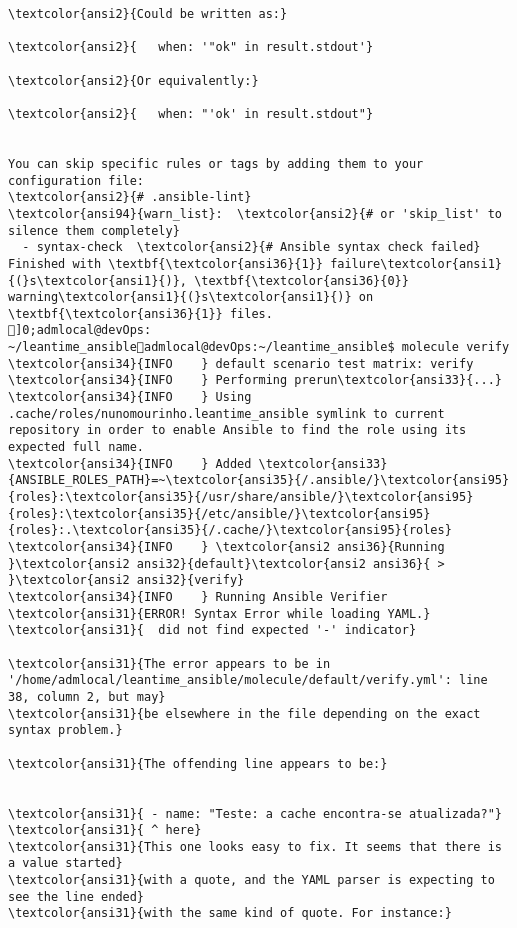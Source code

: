 \documentclass{scrartcl}
\begin{document}
\begin{Verbatim}
\textcolor{ansi2}{Could be written as:}

\textcolor{ansi2}{   when: '"ok" in result.stdout'}

\textcolor{ansi2}{Or equivalently:}

\textcolor{ansi2}{   when: "'ok' in result.stdout"}


You can skip specific rules or tags by adding them to your configuration file:
\textcolor{ansi2}{# .ansible-lint}
\textcolor{ansi94}{warn_list}:  \textcolor{ansi2}{# or 'skip_list' to silence them completely}
  - syntax-check  \textcolor{ansi2}{# Ansible syntax check failed}
Finished with \textbf{\textcolor{ansi36}{1}} failure\textcolor{ansi1}{(}s\textcolor{ansi1}{)}, \textbf{\textcolor{ansi36}{0}} warning\textcolor{ansi1}{(}s\textcolor{ansi1}{)} on \textbf{\textcolor{ansi36}{1}} files.
]0;admlocal@devOps: ~/leantime_ansibleadmlocal@devOps:~/leantime_ansible$ molecule verify
\textcolor{ansi34}{INFO    } default scenario test matrix: verify
\textcolor{ansi34}{INFO    } Performing prerun\textcolor{ansi33}{...}
\textcolor{ansi34}{INFO    } Using .cache/roles/nunomourinho.leantime_ansible symlink to current repository in order to enable Ansible to find the role using its expected full name.
\textcolor{ansi34}{INFO    } Added \textcolor{ansi33}{ANSIBLE_ROLES_PATH}=~\textcolor{ansi35}{/.ansible/}\textcolor{ansi95}{roles}:\textcolor{ansi35}{/usr/share/ansible/}\textcolor{ansi95}{roles}:\textcolor{ansi35}{/etc/ansible/}\textcolor{ansi95}{roles}:.\textcolor{ansi35}{/.cache/}\textcolor{ansi95}{roles}
\textcolor{ansi34}{INFO    } \textcolor{ansi2 ansi36}{Running }\textcolor{ansi2 ansi32}{default}\textcolor{ansi2 ansi36}{ > }\textcolor{ansi2 ansi32}{verify}
\textcolor{ansi34}{INFO    } Running Ansible Verifier
\textcolor{ansi31}{ERROR! Syntax Error while loading YAML.}
\textcolor{ansi31}{  did not find expected '-' indicator}

\textcolor{ansi31}{The error appears to be in '/home/admlocal/leantime_ansible/molecule/default/verify.yml': line 38, column 2, but may}
\textcolor{ansi31}{be elsewhere in the file depending on the exact syntax problem.}

\textcolor{ansi31}{The offending line appears to be:}


\textcolor{ansi31}{ - name: "Teste: a cache encontra-se atualizada?"}
\textcolor{ansi31}{ ^ here}
\textcolor{ansi31}{This one looks easy to fix. It seems that there is a value started}
\textcolor{ansi31}{with a quote, and the YAML parser is expecting to see the line ended}
\textcolor{ansi31}{with the same kind of quote. For instance:}


\end{Verbatim}
\end{document}
